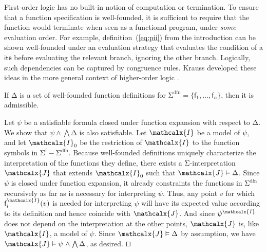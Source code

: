 \documentclass[runningheads,a4paper]{llncs}
\renewcommand\models{\mathrel{\vDash}}
\newcommand\DDD{\Delta}
\newcommand{\con}[1]{\mathsf{#1}}
\let\const=\con
\renewcommand\vec[1]{\overline{#1}}
\let\oldSigma=\Sigma
\def\Sigma{\mathrm{\oldSigma}}
\let\oldDelta=\Delta
\def\Delta{\mathrm{\oldDelta}}
\let\oldwedge=\wedge
\def\wedge{\mathrel{\oldwedge}}
\newcommand{\terms}{\mathcalx{T}}
\newcommand{\I}{\mathcalx{I}}
\newcommand{\J}{\mathcalx{J}}
\newcommand{\sfuns}[1]{#1^\mathrm{f}}
\newcommand{\sfundefs}[1]{#1^\mathrm{dfn}}
\newcommand{\lite}{\con{ite}}
\renewcommand\qed{{\hfill$\squareforqed$}}
\begin{document}
First-order logic has no built-in notion of computation or termination. To ensure
that a function specification is well-founded, it is sufficient to require that
the function would terminate when seen as a functional program, under \emph{some}
evaluation order. For example, definition~(\ref{eq:pii}) from the
introduction can be shown well-founded under an evaluation strategy that
evaluates the condition of a $\lite$ before evaluating the relevant branch,
ignoring the other branch. Logically, such dependencies can be captured by
congruence rules. Krauss developed these ideas in the more general context of
higher-order logic \cite[Section 2]{krauss-2009-phd}.

\begin{theorem}\label{thm:adm}
If\/
$\DDD$ is a set of well-founded function definitions for\/
$\sfundefs{\Sigma} = \{\con{f}_1,\ldots,\con{f}_n\}$, then it is admissible.
\end{theorem}
\begin{proofsketch}
Let $\psi$ be a satisfiable formula closed under function expansion with
respect to $\DDD$. We show that $\psi \wedge \bigwedge \Delta$ is also
satisfiable. Let $\I$ be a model of $\psi$, and
let $\I_0$ be the restriction of $\I$ to the function symbols in $\sfuns{\Sigma} -
\sfundefs{\Sigma}$. Because well-founded definitions uniquely characterize
the interpretation of the functions they define, there exists a
$\Sigma$-interpretation $\J$ that extends $\I_0$ such that $\J \models \Delta$.
%
Since $\psi$ is closed under function expansion, it already constraints the
functions in $\sfundefs{\Sigma}$ recursively as far as is
necessary for interpreting $\psi$. Thus, any point $v$ for which
$\const{f}_i^\I(v)$ is needed for interpreting $\psi$ will have its
expected value according to its definition and hence coincide with $\J$.
And since $\psi^\I$ does not depend on the interpretation at the other
points, $\J$ is, like $\I$, a model of $\psi$.
Since $\J \models \Delta$ by assumption, we have $\J \models \psi \wedge
\bigwedge \Delta$, as desired.
\qed
\end{proofsketch}
\end{document}
